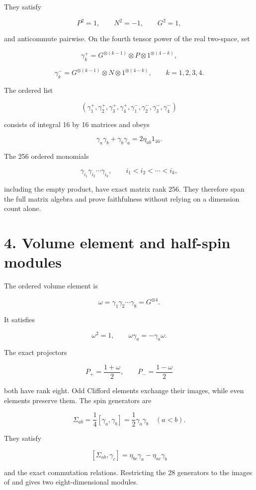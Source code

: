 \documentclass[11pt]{article}
\begin{document}
They satisfy

\[
P^2=1,\qquad N^2=-1,\qquad G^2=1,
\]

and anticommute pairwise. On the fourth tensor power of the real two-space, set

\[
\gamma_k^{+}=G^{\otimes(k-1)}\otimes P\otimes
1^{\otimes(4-k)},
\]

\[
\gamma_k^{-}=G^{\otimes(k-1)}\otimes N\otimes
1^{\otimes(4-k)},
\qquad k=1,2,3,4.
\]

The ordered list

\[
(\gamma_1^+,\gamma_2^+,\gamma_3^+,\gamma_4^+,
\gamma_1^-,\gamma_2^-,\gamma_3^-,\gamma_4^-)
\]

consists of integral 16 by 16 matrices and obeys

\[
\gamma_a\gamma_b+\gamma_b\gamma_a=2\eta_{ab}1_{16}.
\]

The 256 ordered monomials

\[
\gamma_{i_1}\gamma_{i_2}\cdots\gamma_{i_k},
\qquad i_1<i_2<\cdots<i_k,
\]

including the empty product, have exact matrix rank 256. They therefore span the full matrix algebra and prove faithfulness without relying on a dimension count alone.

\section{4. Volume element and half-spin modules}

The ordered volume element is

\[
\omega=\gamma_1\gamma_2\cdots\gamma_8=G^{\otimes4}.
\]

It satisfies

\[
\omega^2=1,
\qquad
\omega\gamma_a=-\gamma_a\omega.
\]

The exact projectors

\[
P_+=\frac{1+\omega}{2},
\qquad
P_-=\frac{1-\omega}{2}
\]

both have rank eight. Odd Clifford elements exchange their images, while even elements preserve them. The spin generators are

\[
\Sigma_{ab}=\frac14[\gamma_a,\gamma_b]
=\frac12\gamma_a\gamma_b\quad(a<b).
\]

They satisfy

\[
[\Sigma_{ab},\gamma_c]
=\eta_{bc}\gamma_a-\eta_{ac}\gamma_b
\]

and the exact \texttt{} commutation relations. Restricting the 28 generators to the images of \texttt{} and \texttt{} gives two eight-dimensional modules.
\end{document}
